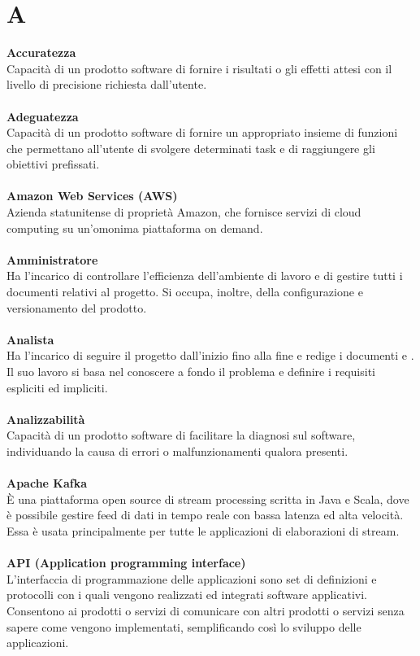 \section{A}
\textbf{Accuratezza}\\
Capacità di un prodotto software di fornire i risultati o gli effetti attesi con il livello di precisione richiesta
dall'utente.\\ \\
\textbf{Adeguatezza}\\
Capacità di un prodotto software di fornire un appropriato insieme di funzioni che permettano all'utente di svolgere determinati task e di raggiungere gli obiettivi prefissati.\\ \\
\textbf{Amazon Web Services (AWS)}\\
Azienda statunitense di proprietà Amazon, che fornisce servizi di cloud computing su un'omonima piattaforma on demand. \\ \\
\textbf{Amministratore}\\
Ha l'incarico di controllare l'efficienza dell'ambiente di lavoro e di gestire tutti i documenti relativi al progetto. Si occupa, inoltre, della configurazione e versionamento del prodotto.\\ \\
\textbf{Analista}\\
Ha l'incarico di seguire il progetto dall'inizio fino alla fine e redige i documenti \SdF{} e \AdR{}. Il suo lavoro si basa nel conoscere a fondo il problema e definire i requisiti espliciti ed impliciti.\\ \\
\textbf{Analizzabilità}\\
Capacità di un prodotto software di facilitare la diagnosi sul software, individuando la causa di errori o malfunzionamenti qualora presenti.\\ \\
\textbf{Apache Kafka}\\
È una piattaforma open source di stream processing scritta in Java e Scala, dove è possibile gestire feed di dati in tempo reale con bassa latenza ed alta velocità. Essa è usata principalmente per tutte le applicazioni di elaborazioni di stream.  \\ \\
\textbf{API (Application programming interface)}\\
L'interfaccia di programmazione delle applicazioni sono set di definizioni e protocolli con i quali vengono realizzati ed integrati software applicativi. Consentono ai  prodotti o servizi di comunicare con altri prodotti o servizi senza sapere come vengono implementati, semplificando così lo sviluppo delle applicazioni. \\ \\
